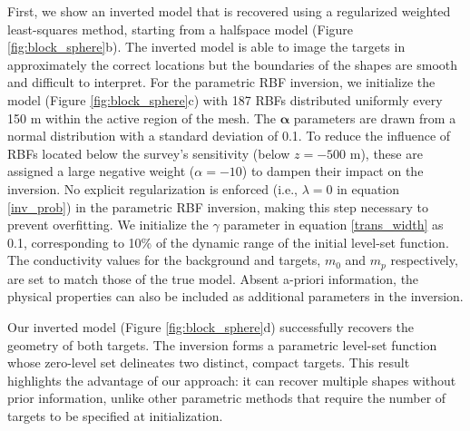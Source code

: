 \documentclass{segabs}
\begin{document}
First, we show an inverted model that is recovered using a regularized weighted least-squares method, starting from a halfspace model (Figure \ref{fig:block_sphere}b). The inverted model is able to image the targets in approximately the correct locations but the boundaries of the shapes are smooth and difficult to interpret. For the parametric RBF inversion, we initialize the model (Figure \ref{fig:block_sphere}c) with 187 RBFs distributed uniformly every 150 m within the active region of the mesh. The $\mathbf{\alpha}$ parameters are drawn from a normal distribution with a standard deviation of 0.1. To reduce the influence of RBFs located below the survey's sensitivity (below $z = -500$ m), these are assigned a large negative weight ($\alpha = -10$) to dampen their impact on the inversion. No explicit regularization is enforced (i.e., $\lambda=0$ in equation \eqref{inv_prob}) in the parametric RBF inversion, making this step necessary to prevent overfitting. We initialize the $\gamma$ parameter in equation \ref{trans_width} as 0.1, corresponding to 10\% of the dynamic range of the initial level-set function. The conductivity values for the background and targets, $m_0$ and $m_p$ respectively, are set to match those of the true model. Absent a-priori information, the physical properties can also be included as additional parameters in the inversion.

Our inverted model (Figure \ref{fig:block_sphere}d) successfully recovers the geometry of both targets. The inversion forms a parametric level-set function whose zero-level set delineates two distinct, compact targets. This result highlights the advantage of our approach: it can recover multiple shapes without prior information, unlike other parametric methods that require the number of targets to be specified at initialization.
\end{document}
